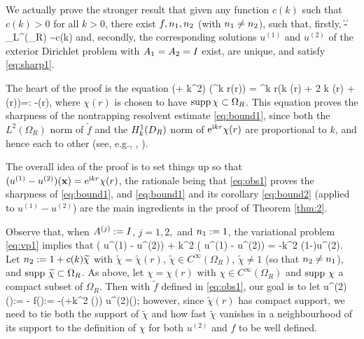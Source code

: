 We actually prove the stronger result that given any function $c(k)$ such that $c(k)>0$ for all $k>0$, there exist 
$f, n_{1}, n_{2}$ (with $n_{1}\not= n_{2}$), such that, firstly,
\beqs
\big\|\no-\nt\big\|_{L^\infty(\Omega_R)} \sim c(k)
\eeqs
and, secondly,
the corresponding solutions $u^{(1)}$ and $u^{(2)}$ of the exterior Dirichlet problem with $A_{1} = A_{2}= I$ exist, are unique, and satisfy \eqref{eq:sharp1}. 

The heart of the proof is the equation
\beq\label{eq:obs1}
(\Delta + k^2) \big(\re^{\ri k r}\chi(r)\big) =  \re^{\ri k r}\left(\ri k  \chi(r) + 2 \ri k (r) + \Delta \chi(r)\right)=: -(r),
\eeq
where $\chi(r)$ is chosen to have $\operatorname{supp} \chi \subset \Omega_R$.
This equation proves the sharpness of the nontrapping resolvent estimate \eqref{eq:bound1}, since both the $L^2(\Omega_R)$ norm of $\widetilde{f}$ and the $\HokDR$ norm of $\mathrm{e}^{\mathrm{i} kr}\chi(r)$ are proportional to $k$, and hence each to other (see, e.g., \cite[Lemma 3.10]{ChMo:08},  \cite[Lemma 4.12]{Sp:14}).

The overall idea of the proof is to set things up so that $(u^{(1)}-u^{(2)})(\mathbf{x}) = \mathrm{e}^{\mathrm{i} k r}\chi(r)$, the rationale being that \eqref{eq:obs1} proves the sharpness of \eqref{eq:bound1}, and \eqref{eq:bound1} and its corollary \eqref{eq:bound2} (applied to $u^{(1)}-u^{(2)}$) are the main ingredients in the proof of Theorem \ref{thm:2}.

Observe that, when $A^{(j)}:=I$, $j=1,2,$ and $n_{1}:=1$, the variational problem \eqref{eq:vp1} implies that 
\beq\label{eq:obs2}
\Delta \big( u^{(1)} - u^{(2)}\big) + k^2 \big( u^{(1)} - u^{(2)}\big) = -k^2 \big(1-\nt\big)u^{(2)}.
\eeq
Let $n_{2}:= 1 + c(k)\widetilde{\chi}$ with $\widetilde{\chi}= \widetilde{\chi}(r)$, $\widetilde{\chi}\in C^{\infty}(\Omega_R)$, $\widetilde{\chi}\not = 1$ (so that $n_{2}\not = n_{1}$), and 
 $\operatorname{supp} \, \widetilde{\chi} \subset\Omega_R$. 
As above, let $\chi=\chi(r)$ with $\chi \in C^{\infty}(\Omega_R)$ and
$\operatorname{supp} \,\chi$ a compact subset of $\Omega_R$. Then with $\widetilde{f}$ defined in \eqref{eq:obs1}, our goal is to let 
\beq\label{eq:obs3}
u^{(2)}(\bx):= - \quad\tand\quad  f(\bx):= -\big(\Delta +k^2 \nt(\bx)\big) u^{(2)}(\bx);
\eeq
however, since $\widetilde{\chi}(r)$ has compact support, we need to tie both the support of $\widetilde{\chi}$ and how fast $\widetilde{\chi}$ vanishes in a neighbourhood of its support to the definition of $\chi$ for both $u^{(2)}$ and $f$ to be well defined.


